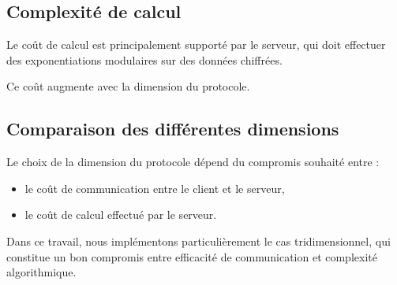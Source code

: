 \documentclass[12pt,a4paper]{report}
\begin{document}
\subsection{Complexité de calcul}

Le coût de calcul est principalement supporté par le serveur, qui doit effectuer des exponentiations modulaires sur des données chiffrées.

Ce coût augmente avec la dimension du protocole.

\subsection{Comparaison des différentes dimensions}

Le choix de la dimension du protocole dépend du compromis souhaité entre :

\begin{itemize}

\item le coût de communication entre le client et le serveur,

\item le coût de calcul effectué par le serveur.

\end{itemize}

Dans ce travail, nous implémentons particulièrement le cas tridimensionnel, qui constitue un bon compromis entre efficacité de communication et complexité algorithmique.
\end{document}

